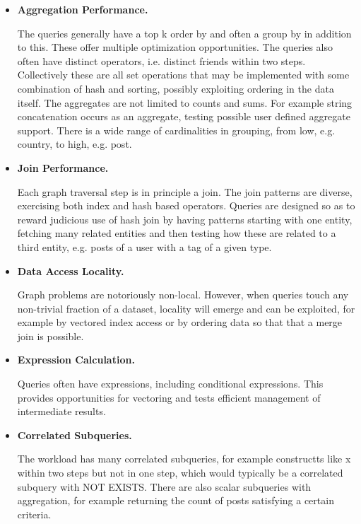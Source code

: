 \begin{itemize}
    \item \textbf{Aggregation Performance.}

        The queries generally have a top k order by and often a group by in
        addition to this.  These offer multiple optimization opportunities.
        The queries also often have distinct operators, i.e. distinct friends
        within two steps.  Collectively these are all set operations that may
        be implemented with some combination of hash and sorting, possibly
        exploiting ordering in the data itself.  The aggregates are not
        limited to counts and sums.  For example string concatenation occurs
        as an aggregate, testing possible user defined aggregate support.
        There is a wide range of cardinalities in grouping, from low, e.g. country, to high, e.g. post.

    \item \textbf{Join Performance.}

        Each graph traversal step is in principle a join.  The join patterns are
        diverse, exercising both index and hash based operators.   Queries are designed
        so as to reward judicious use of hash join by having patterns starting with one
        entity, fetching many related entities and then testing how these are related
        to a third entity, e.g. posts of a user with a tag of a given type. 

    \item \textbf{Data Access Locality.}

        Graph problems are notoriously non-local.  However, when queries touch
        any non-trivial fraction of a dataset, locality will emerge and can be
        exploited, for example by vectored index access or by ordering data so
        that that a merge join is possible.

    \item \textbf{Expression Calculation.}

        Queries often have expressions, including conditional expressions.
        This provides opportunities for vectoring and tests efficient
        management of intermediate results.

    \item \textbf{Correlated Subqueries.}

        The workload has many correlated subqueries, for example constructts
        like x within two steps but not in one step, which would typically be
        a correlated subquery with NOT EXISTS.  There are also scalar
        subqueries with aggregation, for example returning the count of posts
        satisfying a certain criteria.



\end{itemize}
